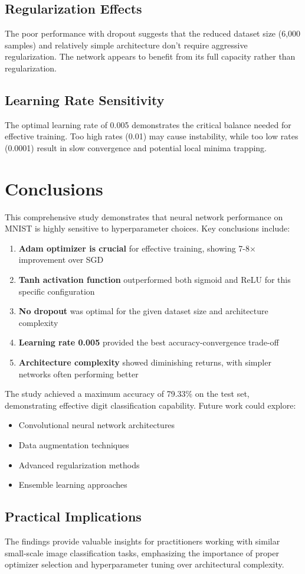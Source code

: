 \documentclass[11pt,a4paper]{article}
\begin{document}
\subsection{Regularization Effects}
The poor performance with dropout suggests that the reduced dataset size (6,000 samples) and relatively simple architecture don't require aggressive regularization. The network appears to benefit from its full capacity rather than regularization.

\subsection{Learning Rate Sensitivity}
The optimal learning rate of 0.005 demonstrates the critical balance needed for effective training. Too high rates (0.01) may cause instability, while too low rates (0.0001) result in slow convergence and potential local minima trapping.

\section{Conclusions}

This comprehensive study demonstrates that neural network performance on MNIST is highly sensitive to hyperparameter choices. Key conclusions include:

\begin{enumerate}
    \item \textbf{Adam optimizer is crucial} for effective training, showing 7-8× improvement over SGD
    \item \textbf{Tanh activation function} outperformed both sigmoid and ReLU for this specific configuration
    \item \textbf{No dropout} was optimal for the given dataset size and architecture complexity
    \item \textbf{Learning rate 0.005} provided the best accuracy-convergence trade-off
    \item \textbf{Architecture complexity} showed diminishing returns, with simpler networks often performing better
\end{enumerate}

The study achieved a maximum accuracy of 79.33\% on the test set, demonstrating effective digit classification capability. Future work could explore:
\begin{itemize}
    \item Convolutional neural network architectures
    \item Data augmentation techniques
    \item Advanced regularization methods
    \item Ensemble learning approaches
\end{itemize}

\subsection{Practical Implications}
The findings provide valuable insights for practitioners working with similar small-scale image classification tasks, emphasizing the importance of proper optimizer selection and hyperparameter tuning over architectural complexity.
\end{document}
